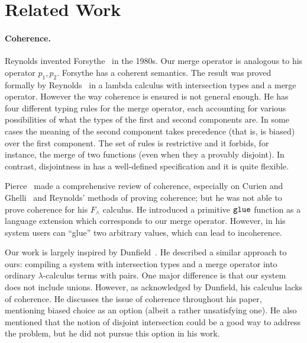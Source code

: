 \section{Related Work}
\label{sec:related-work}

\paragraph{Coherence.}

Reynolds invented Forsythe~\cite{reynolds1997design} in the 1980s. Our merge
operator is analogous to his operator $p_1, p_2 $. Forsythe has a coherent
semantics. The result was proved formally by
Reynolds~\cite{reynolds1991coherence} in a lambda calculus with intersection
types and a merge operator. However  the way coherence is ensured is not general
enough. He has four different typing rules for the merge operator, each
accounting for various possibilities of what the types of the first and second
components are. In some cases the meaning of the second component takes
precedence (that is, is biased) over the first component. The set of rules is
restrictive and it forbids, for instance, the merge of two functions (even when
they a provably disjoint). In contrast, disjointness in \name has a well-defined
specification and it is quite flexible.

Pierce~\cite{pierce1991programming2} made a comprehensive review
of coherence, especially on Curien and Ghelli~\cite{curienl1990coherence} and
Reynolds' methods of proving coherence; but he was not able to prove coherence
for his $F_\wedge$ calculus. He introduced a primitive $\texttt{glue}$ function as
a language extension which corresponds to our merge operator. However, in his
system users can ``glue'' two arbitrary values, which can lead to incoherence.

Our work is largely inspired by Dunfield~\cite{dunfield2014elaborating}. He
described a similar approach to ours: compiling a system with intersection types
and a merge operator into ordinary $ \lambda $-calculus terms with pairs. One
major difference is that our system does not include unions. However, as
acknowledged by Dunfield, his calculus lacks of coherence. He discusses the
issue of coherence throughout his paper, mentioning biased choice as an option
(albeit a rather unsatisfying one). He also mentioned that the notion of
disjoint intersection could be a good way to address the problem, but he did not
pursue this option in his work.

